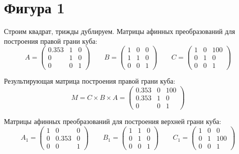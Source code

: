 \section[Фигура 1]{Фигура 1}
Строим квадрат, трижды дублируем. 
Матрицы афинных преобразований для построения правой грани куба:
\begin{equation*}
    A = 
    \begin{pmatrix}
        0.353&  1& 0\\
        0&  1& 0\\
        0&  0& 1
    \end{pmatrix} \hspace{24pt}
    B = 
    \begin{pmatrix}
        1&  0& 0\\
        1&  1& 0\\
        0&  0& 1
    \end{pmatrix} \hspace{24pt}
    C = 
    \begin{pmatrix}
        1&  0& 100\\
        0&  1& 0\\
        0&  0& 1
    \end{pmatrix}
\end{equation*}

Результирующая матрица построения правой грани куба:
\begin{equation*}
    M = C\times B\times A =
    \begin{pmatrix}
        0.353&  0& 100\\
        0.353&  1& 0\\
        0&  0& 1
    \end{pmatrix}
\end{equation*}
\vspace{12pt}

Матрицы афинных преобразований для построения верхней грани куба:
\begin{equation*}
    A_{1} = 
    \begin{pmatrix}
        1&  0& 0\\
        0&  0.353& 0\\
        0&  0& 1
    \end{pmatrix} \hspace{24pt}
    B_{1} = 
    \begin{pmatrix}
        1&  1& 0\\
        0&  1& 0\\
        0&  0& 1
    \end{pmatrix} \hspace{24pt}
    C_{1} = 
    \begin{pmatrix}
        1&  0& 0\\
        0&  1& 100\\
        0&  0& 1
    \end{pmatrix}
\end{equation*}

